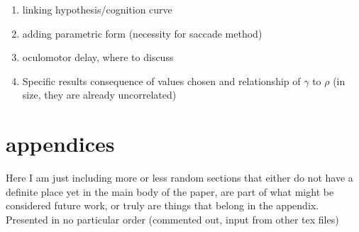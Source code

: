 \begin{singlespace}
\begin{enumerate}
\item linking hypothesis/cognition curve
\item adding parametric form (necessity for saccade method)
\item oculomotor delay, where to discuss
\item Specific results consequence of values chosen and relationship of $\gamma$ to $\rho$ (in size, they are already uncorrelated)
\end{enumerate}
\end{singlespace}


\section{appendices}

Here  I am just including more or less random sections that either do not have a definite place yet in the main body of the paper, are part of what might be considered future work, or truly are things that belong in the appendix. Presented in no particular order (commented out, input from other tex files)


%

%








